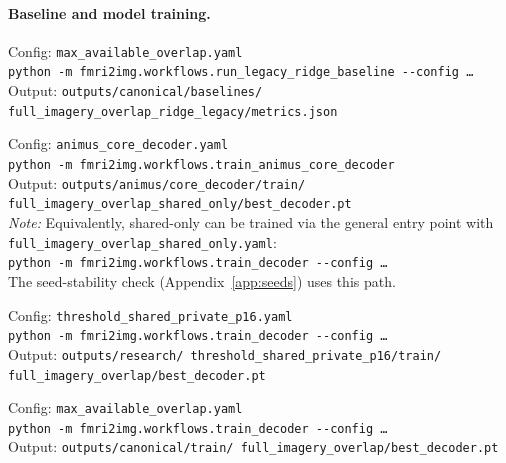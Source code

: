 \documentclass{article}
\begin{document}
\paragraph{Baseline and model training.}
\begin{description}[style=nextline,font=\normalfont\itshape,
                    leftmargin=0.5em,itemsep=6pt]
\item[Ridge baseline.]
  Config: \texttt{max\_available\_overlap.yaml}\\
  \texttt{python -m fmri2img.workflows.run\_legacy\_ridge\_baseline
  -{}-config \ldots}\\
  Output: \texttt{outputs/canonical/baselines/\allowbreak
  full\_imagery\_overlap\_ridge\_legacy/\allowbreak metrics.json}

\item[Shared-only (Animus Core Decoder).]
  Config: \texttt{animus\_core\_decoder.yaml}\\
  \texttt{python -m fmri2img.workflows.train\_animus\_core\_decoder}\\
  Output: \texttt{outputs/animus/core\_decoder/\allowbreak train/\allowbreak
  full\_imagery\_overlap\_shared\_only/\allowbreak best\_decoder.pt}\\[2pt]
  \textit{Note:} Equivalently, shared-only can be trained via the general
  entry point with
  \texttt{full\_imagery\_overlap\_shared\_only.yaml}:\\
  \texttt{python -m fmri2img.workflows.train\_decoder -{}-config \ldots}\\
  The seed-stability check (Appendix~\ref{app:seeds}) uses this path.

\item[Shared-private, $d_\mathrm{priv}\!=\!16$.]
  Config: \texttt{threshold\_shared\_private\_p16.yaml}\\
  \texttt{python -m fmri2img.workflows.train\_decoder -{}-config \ldots}\\
  Output: \texttt{outputs/research/\allowbreak
  threshold\_shared\_private\_p16/\allowbreak train/\allowbreak
  full\_imagery\_overlap/\allowbreak best\_decoder.pt}

\item[Shared-private default.]
  Config: \texttt{max\_available\_overlap.yaml}\\
  \texttt{python -m fmri2img.workflows.train\_decoder -{}-config \ldots}\\
  Output: \texttt{outputs/canonical/train/\allowbreak
  full\_imagery\_overlap/\allowbreak best\_decoder.pt}


\end{description}
\end{document}
